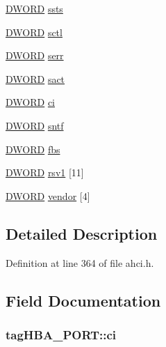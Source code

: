 \begin{DoxyCompactItemize}
\hyperlink{ahci_8h_af483253b2143078cede883fc3c111ad2}{D\+W\+O\+RD} \hyperlink{structtagHBA__PORT_ad96e7508ddfd2c65f76bc866b24bd2fd}{ssts}
\item 
\hyperlink{ahci_8h_af483253b2143078cede883fc3c111ad2}{D\+W\+O\+RD} \hyperlink{structtagHBA__PORT_af3a750481870d182c0a3b8d50f0fd407}{sctl}
\item 
\hyperlink{ahci_8h_af483253b2143078cede883fc3c111ad2}{D\+W\+O\+RD} \hyperlink{structtagHBA__PORT_a3dffc0b938071d117344f0af99daf43c}{serr}
\item 
\hyperlink{ahci_8h_af483253b2143078cede883fc3c111ad2}{D\+W\+O\+RD} \hyperlink{structtagHBA__PORT_a9e82a6b395a7d847987303bd711239e7}{sact}
\item 
\hyperlink{ahci_8h_af483253b2143078cede883fc3c111ad2}{D\+W\+O\+RD} \hyperlink{structtagHBA__PORT_a908838f0c781ae69d7bef4074e2e7d2f}{ci}
\item 
\hyperlink{ahci_8h_af483253b2143078cede883fc3c111ad2}{D\+W\+O\+RD} \hyperlink{structtagHBA__PORT_a21ca4c8f43026c753673b47d6c89b022}{sntf}
\item 
\hyperlink{ahci_8h_af483253b2143078cede883fc3c111ad2}{D\+W\+O\+RD} \hyperlink{structtagHBA__PORT_a230076311b6afef9af139b3ca7cec13a}{fbs}
\item 
\hyperlink{ahci_8h_af483253b2143078cede883fc3c111ad2}{D\+W\+O\+RD} \hyperlink{structtagHBA__PORT_aadacc981aa847f84f0443d883fc15931}{rsv1} \mbox{[}11\mbox{]}
\item 
\hyperlink{ahci_8h_af483253b2143078cede883fc3c111ad2}{D\+W\+O\+RD} \hyperlink{structtagHBA__PORT_a8d00362b7a8c6f595c99f6eb87bededf}{vendor} \mbox{[}4\mbox{]}
\end{DoxyCompactItemize}


\subsection{Detailed Description}


Definition at line 364 of file ahci.\+h.



\subsection{Field Documentation}
\subsubsection[{\texorpdfstring{ci}{ci}}]{ tag\+H\+B\+A\+\_\+\+P\+O\+R\+T\+::ci}\hypertarget{structtagHBA__PORT_a908838f0c781ae69d7bef4074e2e7d2f}{}\label{structtagHBA__PORT_a908838f0c781ae69d7bef4074e2e7d2f}


